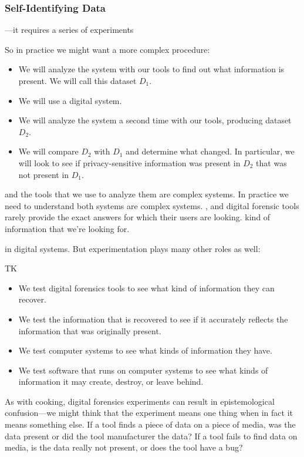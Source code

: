 \subsubsection{Self-Identifying Data}





---it requires a series of experiments 



So in practice we might want a more complex procedure:

\begin{itemize}
\item We will analyze the system with our tools to find out what
  information is present. We will call this dataset $D_1$. 
\item We will use a digital system.
\item We will analyze the system a second time with our tools,
  producing dataset $D_2$. 
\item We will compare $D_2$ with $D_1$ and determine what changed. In
  particular, we will look to see if privacy-sensitive information was
  present in $D_2$ that was not present in $D_1$. 
\end{itemize}



and
the tools that we use to analyze them are complex systems. In practice
we need to understand both systems are
complex systems. , and digital forensic tools rarely provide the
exact answers for which their users are looking. kind of information that we're looking for. 

in
digital systems. But experimentation plays many other roles as well:

TK

\begin{itemize}
\item We test digital forensics tools to see what kind of information they can recover.
\item We test the information that is recovered to see if it
  accurately reflects the information that was originally present.
\item We test computer systems to see what kinds of information they have.
\item We test software that runs on computer systems to see what kinds
  of information it may create, destroy, or leave behind.
\end{itemize}

As with cooking, digital forensics experiments can result in epistemological
confusion---we might think that the experiment means one thing when in
fact it means something else. If a tool finds a piece of data on a piece of media, was
the data present or did the tool manufacturer the data? If a tool
fails to find data on media, is the data really not present, or does
the tool have a bug?

